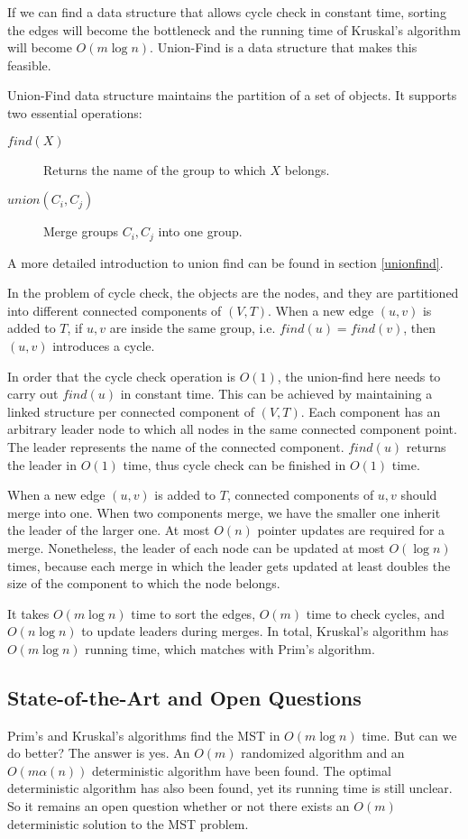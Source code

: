 If we can find a data structure that allows cycle check in constant time, sorting the edges will become the bottleneck and the running time of Kruskal's algorithm will become $O(m\log n)$. Union-Find is a data structure that makes this feasible.

Union-Find data structure maintains the partition of a set of objects. It supports two essential operations:
\begin{description}
\item[$find(X)$]Returns the name of the group to which $X$ belongs.
\item[$union(C_i, C_j)$]Merge groups $C_i,C_j$ into one group.
\end{description} 
A more detailed introduction to union find can be found in section \ref{unionfind}.

In the problem of cycle check, the objects are the nodes, and they are partitioned into different connected components of $(V,T)$. When a new edge $(u,v)$ is added to $T$, if $u,v$ are inside the same group, i.e. $find(u)=find(v)$, then $(u,v)$ introduces a cycle. 

In order that the cycle check operation is $O(1)$, the union-find here needs to carry out $find(u)$ in constant time. This can be achieved by maintaining a linked structure per connected component of $(V,T)$. Each component has an arbitrary leader node to which all nodes in the same connected component point. The leader represents the name of the connected component. $find(u)$ returns the leader in $O(1)$ time, thus cycle check can be finished in $O(1)$ time. 

When a new edge $(u,v)$ is added to $T$, connected components of $u,v$ should merge into one. When two components merge, we have the smaller one inherit the leader of the larger one. At most $O(n)$ pointer updates are required for a merge. Nonetheless, the leader of each node can be updated at most $O(\log n)$ times, because each merge in which the leader gets updated at least doubles the size of the component to which the node belongs. 

It takes $O(m\log n)$ time to sort the edges, $O(m)$ time to check cycles, and $O(n\log n)$ to update leaders during merges. In total, Kruskal's algorithm has $O(m\log n)$ running time, which matches with Prim's algorithm.
\subsection{State-of-the-Art and Open Questions}
Prim's and Kruskal's algorithms find the MST in $O(m\log n)$ time. But can we do better? The answer is yes. An $O(m)$ randomized algorithm and an $O(m\alpha(n))$ deterministic algorithm have been found. The optimal deterministic algorithm has also been found, yet its running time is still unclear. So it remains an open question whether or not there exists an $O(m)$ deterministic solution to the MST problem.
